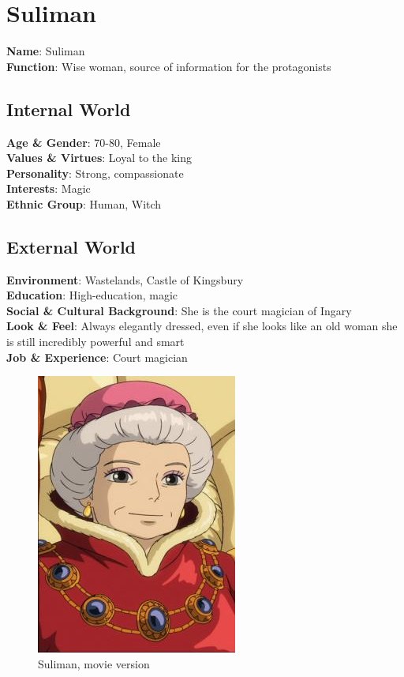 \section{Suliman}

\begin{minipage}{0.5\textwidth}
\textbf{Name}: Suliman\\
\textbf{Function}: Wise woman, source of information for the protagonists

\subsection{Internal World}

\textbf{Age \& Gender}: 70-80, Female \\
\textbf{Values \& Virtues}: Loyal to the king \\
\textbf{Personality}: Strong, compassionate\\
\textbf{Interests}: Magic \\
\textbf{Ethnic Group}: Human, Witch

\subsection{External World}
\textbf{Environment}: Wastelands, Castle of Kingsbury \\
\textbf{Education}: High-education, magic \\
\textbf{Social \& Cultural Background}: She is the court magician of Ingary \\
\textbf{Look \& Feel}: Always elegantly dressed, even if she looks like an old woman she is still incredibly powerful and smart \\
\textbf{Job \& Experience}: Court magician \\

\end{minipage}%
%
\hfill\begin{minipage}{0.4\textwidth}
  \begin{figure}[H]
  \includegraphics{Images/Characters/suliman_portrait}
  \caption{Suliman, movie version}
\end{figure}
\end{minipage}

